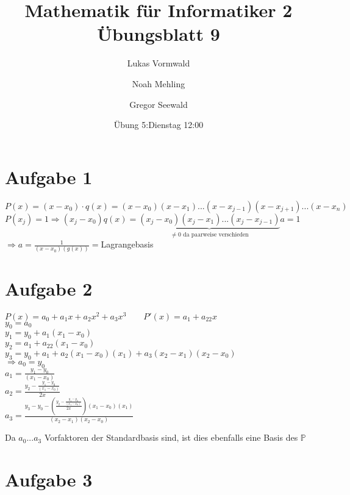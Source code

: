\documentclass[11pt,a4paper]{article}
\title{Mathematik für Informatiker 2\\Übungsblatt 9}
\author{Lukas Vormwald \and Noah Mehling \and Gregor Seewald}
\date{Übung 5:Dienstag 12:00}
\newcommand{\Aufgabe}[1]{\section*{Aufgabe #1}}
\begin{document}
\maketitle

  \Aufgabe{1}
    $P(x)=(x-x_0)\cdot q(x)=(x-x_0)(x-x_1)...(x-x_{j-1})(x-x_{j+1})...(x-x_n)$\\
    $P(x_j)=1\Rightarrow(x_j-x_0)q(x)=\underbrace{(x_j-x_0)(x_j-x_1)...(x_j-x_{j-1})}_{\neq 0 \text{ da paarweise verschieden}}a=1$\\
    $\Rightarrow a=\frac{1}{(x-x_0)(g(x))}=$Lagrangebasis

  \Aufgabe{2}
    $P(x)=a_0+a_1x+a_2x^2+a_3x^3\qquad P'(x)=a_1+a_22x$\\
    $y_0=a_0$\\
    $y_1=y_0+a_1(x_1-x_0)$\\
    $y_2=a_1+a_22(x_1-x_0)$\\
    $y_3=y_0+a_1+a_2(x_1-x_0)(x_1)+a_3(x_2-x_1)(x_2-x_0)$\\
    $\Rightarrow a_0=y_0$\\
    $a_1=\frac{y_1-y_0}{(x_1-x_0)}$\\
    $a_2=\frac{y_2-\frac{y_1-y_0}{(x_1-x_0)}}{2x}$\\
    $a_3=\frac{y_3-y_0-\left(\frac{y_2-\frac{y_1-y_0}{(x_1-x_0)}}{2x}\right)(x_1-x_0)(x_1)}{(x_2-x_1)(x_2-x_0)}$

    Da $a_0 ... a_3$ Vorfaktoren der Standardbasis sind, ist dies ebenfalls eine Basis des $\mathbb{P}$

    \Aufgabe{3}
\end{document}
